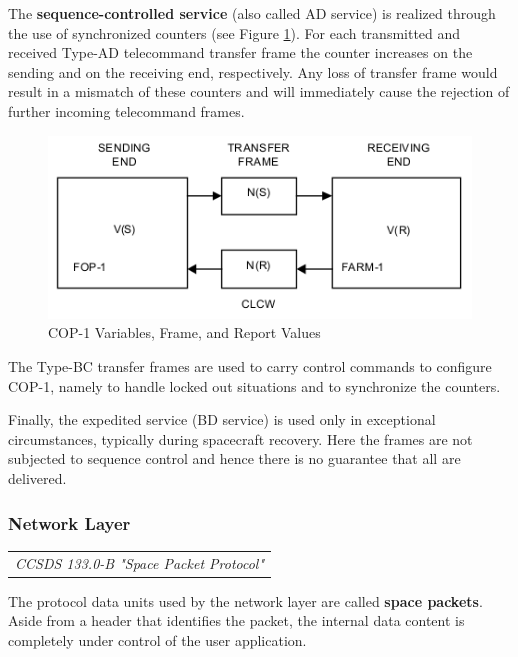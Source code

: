 The \textbf{sequence-controlled service} (also called AD service) is realized through the use of synchronized counters (see Figure \ref{fig: COP-1 Variables, Frame, and Report Values}). For each transmitted and received Type-AD telecommand transfer frame the counter increases on the sending and on the receiving end, respectively. Any loss of transfer frame would result in a mismatch of these counters and will immediately cause the rejection of further incoming telecommand frames.

\begin{figure}[h]
\centering\includegraphics[scale=0.6]{fig/cop-1_variables_frame_and_report_values}
\caption{COP-1 Variables, Frame, and Report Values}
\label{fig: COP-1 Variables, Frame, and Report Values}
\end{figure}

The Type-BC transfer frames are used to carry control commands to configure COP-1, namely to handle locked out situations and to synchronize the counters.

Finally, the expedited service (BD service) is used only in exceptional circumstances, typically during spacecraft recovery. Here the frames are not subjected to sequence control and hence there is no guarantee that all are delivered.

\subsubsection{Network Layer}
\label{sec:Network Layer}

\begin{tabular}{l}
\textit{CCSDS 133.0-B "Space Packet Protocol" \cite{CCSDS 133.0-B}} 
\end{tabular}

The protocol data units used by the network layer are called \textbf{space packets}. Aside from a header that identifies the packet, the internal data content is completely under control of the user application.


